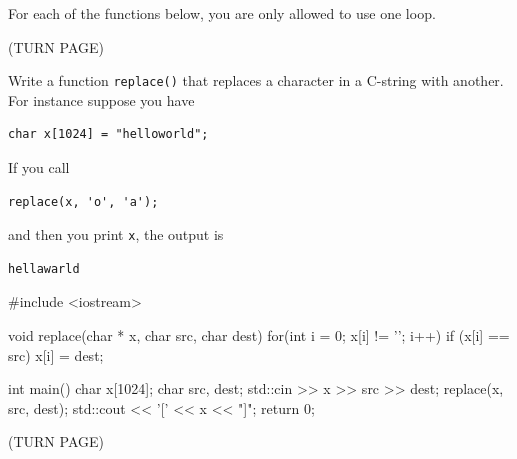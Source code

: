 

For each of the functions below, you are only allowed to use one loop.

(TURN PAGE)

\newpage
\nextq
Write a function \verb!replace()! that replaces a character in a C-string
with another.
For instance suppose you have
\vspace{-2mm}
\begin{Verbatim}[frame=single,fontsize=\small]
char x[1024] = "helloworld";
\end{Verbatim}
\vspace{-5mm}
If you call
\vspace{-3mm}
\begin{Verbatim}[frame=single,fontsize=\small]
replace(x, 'o', 'a');
\end{Verbatim}
\vspace{-4mm}
and then you print \verb!x!, the output is
\vspace{-3mm}
\begin{Verbatim}[frame=single,fontsize=\small]
hellawarld
\end{Verbatim}
\ANSWER
\begin{answercode}
#include <iostream>

void replace(char * x, char src, char dest)
{
  for(int i = 0; x[i] != '\0'; i++)
  {
    if (x[i] == src)
        x[i] = dest;
  }
}

int main()
{
    char x[1024];
    char src, dest;
    std::cin >> x >> src >> dest;
    replace(x, src, dest);
    std::cout << '[' << x << "]\n";
    return 0;
}
\end{answercode}

(TURN PAGE)

